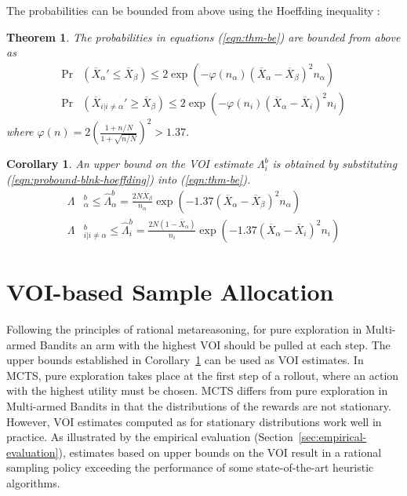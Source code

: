 \documentclass{ecai2012}
\newtheorem{thm}{Theorem}
\newtheorem{crl}{Corollary}
\begin{document}
The probabilities can be bounded from above using the
Hoeffding inequality \cite{Hoeffding.ineq}:
\begin{thm} The probabilities in equations (\ref{eqn:thm-be}) are bounded from above as
\begin{align}
  \label{eqn:probound-blnk-hoeffding}
  \Pr&(\overline X_\alpha' \le \overline X_\beta)
  \le 2\exp\left(- \varphi(n_\alpha)(\overline X_\alpha - \overline X_\beta)^2 n_\alpha
  \right)\nonumber\\
  \Pr&(\overline X_{i|i\ne\alpha}' \ge \overline X_\beta)
  \le 2\exp\left(- \varphi(n_i) (\overline X_\alpha -\overline  X_i)^2 n_i \right)
\end{align}
where $\varphi(n)=2(\frac {1+n/N} {1+\sqrt {n/N}})^2 > 1.37$.
\label{thm:hoeffding-prob-bounds}
\end{thm}
\begin{crl}
An upper bound on the VOI estimate $\Lambda_i^b$ is obtained
by substituting (\ref{eqn:probound-blnk-hoeffding}) into (\ref{eqn:thm-be}).
\begin{align}
  \label{eqn:bound-blnk-hoeffding}
  \Lambda&_\alpha^b \le \hat\Lambda_\alpha^b=\frac {2N\overline X_\beta} {n_\alpha}\exp\left(- 1.37(\overline X_\alpha - \overline X_\beta)^2 n_\alpha\right)\nonumber\\
  \Lambda&_{i|i\ne\alpha}^b\le \hat\Lambda_i^b=  \frac {2N(1-\overline  X_\alpha)} {n_i}\exp\left(- 1.37(\overline X_\alpha - \overline X_i)^2 n_i\right)
\end{align}
\label{crl:bound-blnk-hoeffding}
\end{crl}
\vspace{-24pt}

\section{VOI-based Sample Allocation}

Following the principles of rational metareasoning, for pure
exploration in Multi-armed Bandits an arm with
the highest VOI should be pulled at each step. The upper bounds
established in Corollary~\ref{crl:bound-blnk-hoeffding} can be used
as VOI estimates. In MCTS, pure exploration takes place at the first
step of a rollout, where an action with the highest utility must
be chosen. MCTS differs from pure exploration in Multi-armed Bandits
in that the distributions of the rewards are not stationary. However,
VOI estimates computed as for stationary distributions work well in
practice. As illustrated by the empirical evaluation
(Section~\ref{sec:empirical-evaluation}), estimates based on upper
bounds on the VOI result in a rational sampling policy exceeding the
performance of some state-of-the-art heuristic algorithms.
\end{document}
